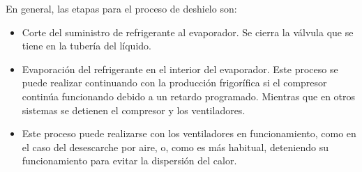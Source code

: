 			En general, las etapas para el proceso de deshielo son:
			\begin{itemize}
				\item Corte del suministro de refrigerante al evaporador. Se cierra la válvula que se tiene en la tubería del líquido.
				\item Evaporación del refrigerante en el interior del evaporador. Este proceso se puede realizar continuando con la producción frigorífica si el compresor continúa funcionando debido a un retardo programado. Mientras que en otros sistemas se detienen el compresor y los ventiladores.
			
				\item Este proceso puede realizarse con los ventiladores en funcionamiento, como en el caso del desescarche por aire, o, como es más habitual, deteniendo su funcionamiento para evitar la dispersión del calor.
			

\end{itemize}
